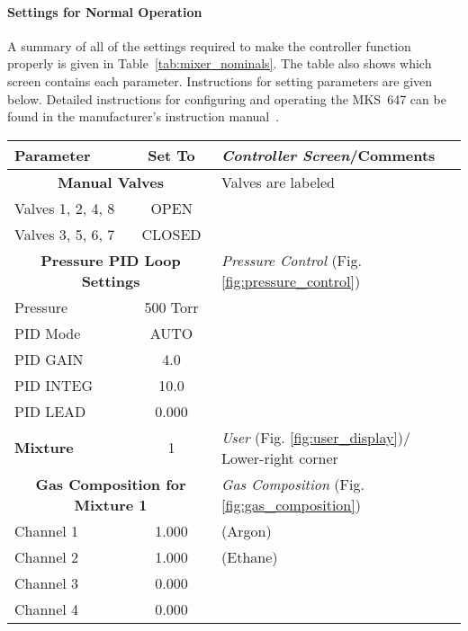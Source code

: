 {\paragraph{Settings for Normal Operation}

A summary of all of the settings required to make the controller
function properly is given in Table~\ref{tab:mixer_nominals}. The
table also shows which screen contains each parameter. Instructions
for setting parameters are given below. Detailed instructions for
configuring and operating the MKS~647 can be found in the
manufacturer's instruction manual~\cite{647C_EN_0504A1}.

\begin{table}[hbt]
\begin{minipage}[h!]{\textwidth}
{\scriptsize
\begin{center}
\begin{tabular}{|l|c|l|}
\hline
Parameter   & Set To   & {\it Controller Screen}/Comments\\ \hline
\multicolumn{2}{|c|}{\bf Manual Valves  } &  Valves are labeled        \\
Valves 1, 2, 4, 8 & OPEN                  &         \\
Valves 3, 5, 6, 7 & CLOSED                &         \\ \hline
\multicolumn{2}{|c|}{\bf Pressure PID Loop Settings   } & {\it Pressure Control} (Fig. \ref{fig:pressure_control})  \\
Pressure    & 500 Torr &                   \\
PID Mode    & AUTO     &                   \\
PID GAIN    & 4.0      &                   \\
PID INTEG   & 10.0     &                   \\
PID LEAD    & 0.000    &                   \\ \hline
\bf Mixture     & 1        & {\it User} (Fig. \ref{fig:user_display})/ Lower-right corner\\ \hline
\multicolumn{2}{|c|}{\bf Gas Composition for Mixture 1} & {\it Gas Composition} (Fig. \ref{fig:gas_composition})\\
Channel 1   & 1.000    &  (Argon)                 \\
Channel 2   & 1.000    &  (Ethane)                 \\
Channel 3   & 0.000    &                   \\
Channel 4   & 0.000    &                   \\ \hline

\end{tabular}
\end{center}}
\end{minipage}
\end{table}}
